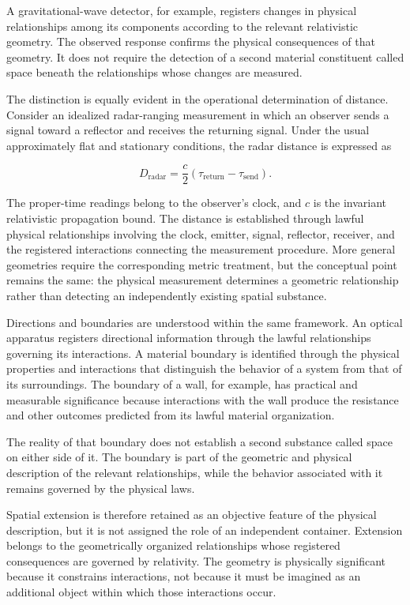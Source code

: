 \documentclass[12pt,onecolumn]{article}
\begin{document}
A gravitational-wave detector, for example, registers changes in physical relationships among its components according to the relevant relativistic geometry. The observed response confirms the physical consequences of that geometry. It does not require the detection of a second material constituent called space beneath the relationships whose changes are measured.

The distinction is equally evident in the operational determination of distance. Consider an idealized radar-ranging measurement in which an observer sends a signal toward a reflector and receives the returning signal. Under the usual approximately flat and stationary conditions, the radar distance is expressed as

\begin{equation}
D_{\mathrm{radar}}
=
\frac{c}{2}
\left(
\tau_{\mathrm{return}}
-
\tau_{\mathrm{send}}
\right).
\end{equation}

The proper-time readings belong to the observer's clock, and \(c\) is the invariant relativistic propagation bound. The distance is established through lawful physical relationships involving the clock, emitter, signal, reflector, receiver, and the registered interactions connecting the measurement procedure. More general geometries require the corresponding metric treatment, but the conceptual point remains the same: the physical measurement determines a geometric relationship rather than detecting an independently existing spatial substance.

Directions and boundaries are understood within the same framework. An optical apparatus registers directional information through the lawful relationships governing its interactions. A material boundary is identified through the physical properties and interactions that distinguish the behavior of a system from that of its surroundings. The boundary of a wall, for example, has practical and measurable significance because interactions with the wall produce the resistance and other outcomes predicted from its lawful material organization.

The reality of that boundary does not establish a second substance called space on either side of it. The boundary is part of the geometric and physical description of the relevant relationships, while the behavior associated with it remains governed by the physical laws.

Spatial extension is therefore retained as an objective feature of the physical description, but it is not assigned the role of an independent container. Extension belongs to the geometrically organized relationships whose registered consequences are governed by relativity. The geometry is physically significant because it constrains interactions, not because it must be imagined as an additional object within which those interactions occur.
\end{document}
